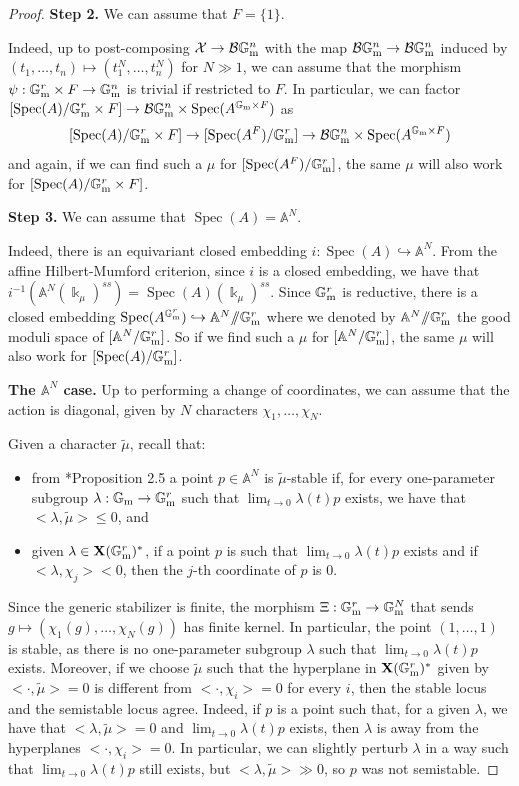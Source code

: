 \documentclass{amsart}
\newcommand{\bA}{\mathbb{A}}
\newcommand{\bG}{\mathbb{G}}
\newcommand{\cB}{\mathcal{B}}
\newcommand{\cX}{\mathcal{X}}
\newcommand{\spec}{\operatorname{Spec}}
\newcommand{\Gm}{\bG_{{\rm m}}}
\theoremstyle{definition}
\theoremstyle{definition}
\begin{document}
{\begin{proof}
    \textbf{Step 2.} We can assume that $F=\{1\}$.

    Indeed, up to post-composing $\cX\to \cB\Gm^n$ with the map $\cB \Gm^n\to \cB\Gm^n$ induced by $(t_1,\ldots ,t_n)\mapsto (t_1^N,\ldots ,t_n^N)$ for $N\gg 1$, we can assume that the morphism $\psi:\Gm^r\times F\to \Gm^n$ is trivial if restricted to $F$.  In particular, we can factor $[\spec(A)/\Gm^r\times F]\to \cB\Gm^n\times \spec(A^{\Gm\times F})$ as
    \[[\spec(A)/\Gm^r\times F]\to [\spec(A^F)/\Gm^r]\to \cB\Gm^n\times \spec(A^{\Gm\times F})\]
    and again, if we can find such a $\mu$ for $[\spec(A^F)/\Gm^r]$, the same $\mu$ will also work for $[\spec(A)/\Gm^r\times F]$. 

    \textbf{Step 3.} We can assume that $\spec(A)=\bA^N$.

    Indeed, there is an equivariant closed embedding $i:\spec(A)\hookrightarrow \bA^N$. From the affine Hilbert-Mumford criterion, since $i$ is a closed embedding, we have that $i^{-1}(\bA^N(\Bbbk_\mu)^{ss}) =\spec(A)(\Bbbk_\mu)^{ss}$. Since $\Gm^r$ is reductive, there is a closed embedding $\spec(A^{\Gm^r})\hookrightarrow \bA^N/\!\!/\Gm^r$ where we denoted by $\bA^N/\!\!/\Gm^r$ the good moduli space of $[\bA^N/\Gm^r]$. So if we find such a $\mu$ for $[\bA^N/\Gm^r]$, the same $\mu$ will also work for $[\spec(A)/\Gm^r]$.

    \textbf{The $\bA^N$ case.} Up to performing a change of coordinates, we can assume that the action is diagonal, given by $N$ characters $\chi_1,\ldots,\chi_N$.
     
    Given a character $\widetilde{\mu}$, recall that:
    \begin{itemize}
        \item from \cite{Hos}*{Proposition 2.5} a point $p\in \bA^N$ is $\widetilde{\mu}$-stable
    if, for every one-parameter subgroup $\lambda:\Gm\to \Gm^r$ such that $\lim_{t\to 0}\lambda(t)p$ exists, we have that $<\lambda, \widetilde{\mu}>\le 0$, and
    \item given $\lambda\in \mathbf{X}(\Gm^r)^*$, if a point $p$ is such that $\lim_{t\to 0}\lambda(t)p$ exists and if $<\lambda,\chi_j><0$, then the $j$-th coordinate of $p$ is 0.
    \end{itemize} 
    
    Since the generic stabilizer is finite, the morphism $\Xi:\Gm^r\to \Gm^N$ that sends $g\mapsto (\chi_1(g),\ldots, \chi_N(g))$ has finite kernel. In particular, the point $(1,\ldots,1)$ is stable, as there is no one-parameter subgroup $\lambda$ such that $\lim_{t\to 0}\lambda(t)p$ exists. Moreover,
    if we choose $\widetilde{\mu}$ such that the hyperplane in
    $\mathbf{X}(\Gm^r)^*$
    given by $<\cdot, \widetilde{\mu}>=0$ is different from $<\cdot, \chi_i>=0$ for every $i$, then the stable locus and the semistable locus agree. Indeed, if $p$ is a point such that,
    for a given $\lambda$, we have that $<\lambda,\widetilde{\mu}>=0$ and $\lim_{t\to 0}\lambda(t)p$ exists, then $\lambda$ is away from the hyperplanes $<\cdot, \chi_i> = 0$. In particular, we can slightly perturb $\lambda$ in a way such that $\lim_{t\to 0}\lambda(t)p$ still exists, but $<\lambda,\widetilde{\mu}> \gg 0$, so $p$ was not semistable.
    

\end{proof}}
\end{document}
